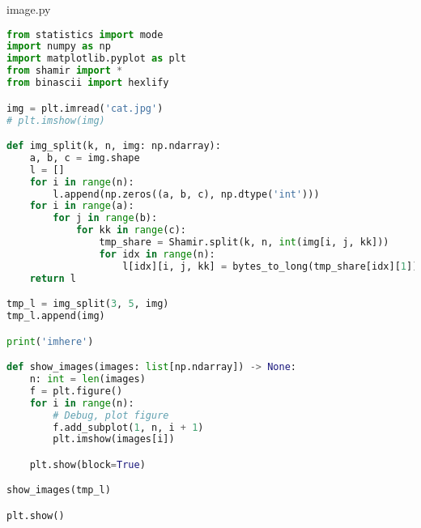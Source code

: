 \newpage
image.py
\begin{lstlisting}[language = Python]
from statistics import mode
import numpy as np
import matplotlib.pyplot as plt
from shamir import *
from binascii import hexlify

img = plt.imread('cat.jpg')
# plt.imshow(img)

def img_split(k, n, img: np.ndarray):
    a, b, c = img.shape
    l = []
    for i in range(n):
        l.append(np.zeros((a, b, c), np.dtype('int')))
    for i in range(a):
        for j in range(b):
            for kk in range(c):
                tmp_share = Shamir.split(k, n, int(img[i, j, kk]))
                for idx in range(n):
                    l[idx][i, j, kk] = bytes_to_long(tmp_share[idx][1])
    return l

tmp_l = img_split(3, 5, img)
tmp_l.append(img)

print('imhere')

def show_images(images: list[np.ndarray]) -> None:
    n: int = len(images)
    f = plt.figure()
    for i in range(n):
        # Debug, plot figure
        f.add_subplot(1, n, i + 1)
        plt.imshow(images[i])

    plt.show(block=True)

show_images(tmp_l)

plt.show()
\end{lstlisting}

\newpage
